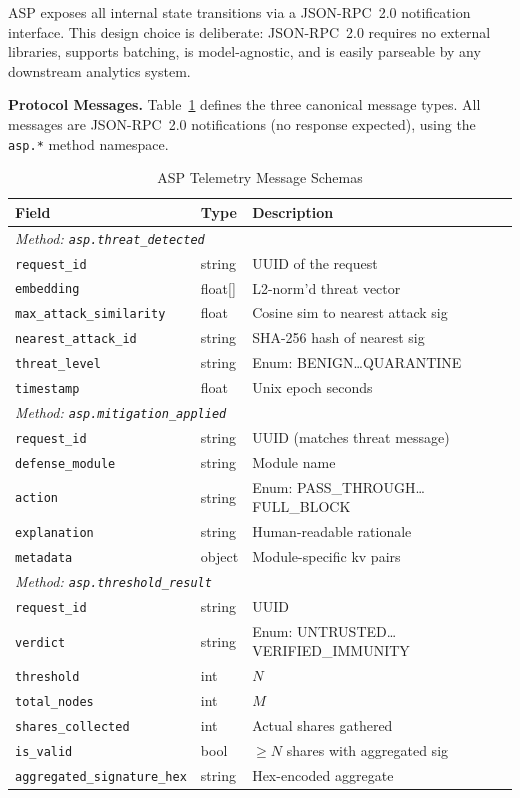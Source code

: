 \documentclass[sigconf,natbib=false]{acmart}
\begin{document}
ASP exposes all internal state transitions via a JSON-RPC~2.0 notification
interface. This design choice is deliberate: JSON-RPC~2.0 requires no
external libraries, supports batching, is model-agnostic, and is easily
parseable by any downstream analytics system.

\textbf{Protocol Messages.}
Table~\ref{tab:telemetry} defines the three canonical message types.
All messages are JSON-RPC~2.0 notifications (no response expected), using
the \texttt{asp.*} method namespace.

\begin{table}[t]
\centering
\caption{ASP Telemetry Message Schemas}
\label{tab:telemetry}
\small
\begin{tabular}{lll}
\toprule
\textbf{Field} & \textbf{Type} & \textbf{Description} \\
\midrule
\multicolumn{3}{l}{\textit{Method: \texttt{asp.threat\_detected}}} \\
\texttt{request\_id}  & string  & UUID of the request \\
\texttt{embedding}    & float[] & L2-norm'd threat vector \\
\texttt{max\_attack\_similarity} & float & Cosine sim to nearest attack sig \\
\texttt{nearest\_attack\_id}    & string & SHA-256 hash of nearest sig \\
\texttt{threat\_level}          & string & Enum: BENIGN…QUARANTINE \\
\texttt{timestamp}    & float   & Unix epoch seconds \\
\midrule
\multicolumn{3}{l}{\textit{Method: \texttt{asp.mitigation\_applied}}} \\
\texttt{request\_id}   & string & UUID (matches threat message) \\
\texttt{defense\_module} & string & Module name \\
\texttt{action}        & string & Enum: PASS\_THROUGH…FULL\_BLOCK \\
\texttt{explanation}   & string & Human-readable rationale \\
\texttt{metadata}      & object & Module-specific kv pairs \\
\midrule
\multicolumn{3}{l}{\textit{Method: \texttt{asp.threshold\_result}}} \\
\texttt{request\_id}   & string & UUID \\
\texttt{verdict}       & string & Enum: UNTRUSTED…VERIFIED\_IMMUNITY \\
\texttt{threshold}     & int    & $N$ \\
\texttt{total\_nodes}  & int    & $M$ \\
\texttt{shares\_collected} & int & Actual shares gathered \\
\texttt{is\_valid}     & bool   & $\geq N$ shares with aggregated sig \\
\texttt{aggregated\_signature\_hex} & string & Hex-encoded aggregate \\
\bottomrule
\end{tabular}
\end{table}
\end{document}
